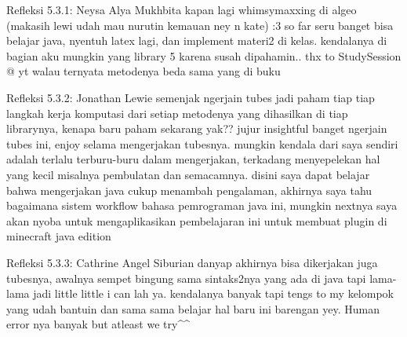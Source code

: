 \begin{komentar}{Refleksi 5.3.1: Neysa Alya Mukhbita}
kapan lagi whimsymaxxing di algeo (makasih lewi udah mau nurutin kemauan ney n kate) :3 so far seru banget bisa belajar java, nyentuh latex lagi, dan implement materi2 di kelas. kendalanya di bagian aku mungkin yang library 5 karena susah dipahamin.. thx to StudySession @ yt walau ternyata metodenya beda sama yang di buku

\end{komentar}

\begin{komentar}{Refleksi 5.3.2: Jonathan Lewie}
 semenjak ngerjain tubes jadi paham tiap tiap langkah kerja komputasi dari setiap metodenya yang dihasilkan di tiap librarynya, kenapa baru paham sekarang yak?? jujur insightful banget ngerjain tubes ini, enjoy selama mengerjakan tubesnya. mungkin kendala dari saya sendiri adalah terlalu terburu-buru dalam mengerjakan, terkadang menyepelekan hal yang kecil misalnya pembulatan dan semacamnya. disini saya dapat belajar bahwa mengerjakan java cukup menambah pengalaman, akhirnya saya tahu bagaimana sistem workflow bahasa pemrograman java ini, mungkin nextnya saya akan nyoba untuk mengaplikasikan pembelajaran ini untuk membuat plugin di minecraft java edition
\end{komentar}

\begin{komentar}{Refleksi 5.3.3: Cathrine Angel Siburian}
 danyap akhirnya bisa dikerjakan juga tubesnya, awalnya sempet bingung sama sintaks2nya yang ada di java tapi lama-lama jadi little little i can lah ya. kendalanya banyak tapi tengs to my kelompok yang udah bantuin dan sama sama belajar hal baru ini barengan yey. Human error nya banyak but atleast we try\^{}\^{}
\end{komentar}